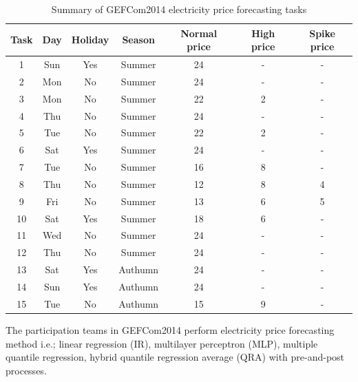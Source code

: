 \documentclass[review]{elsarticle}
\begin{document}
      \begin{table}[H]
        \begin{center}
        \caption{Summary of GEFCom2014 electricity price forecasting tasks}
        \begin{adjustbox}{width=\textwidth}
          \begin{tabular}{|c|c|c|c|c|c|c|}
            \hline
            Task & Day & Holiday & Season & Normal price & High price & Spike price\\
            \hline
            1 & Sun & Yes & Summer & 24 & - & -\\
            2 & Mon & No & Summer & 24 & - & -\\
            3 & Mon & No & Summer & 22 & 2 & -\\
            4 & Thu & No & Summer & 24 & - & -\\
            5 & Tue & No & Summer & 22 & 2 & -\\
            6 & Sat & Yes & Summer & 24 & - & -\\
            7 & Tue & No & Summer & 16 & 8 & -\\
            8 & Thu & No & Summer & 12 & 8 & 4\\
            9 & Fri & No & Summer & 13 & 6 & 5\\
            10 & Sat & Yes & Summer & 18 & 6 & -\\
            11 & Wed & No & Summer & 24 & - & -\\
            12 & Thu & No & Summer & 24 & - & -\\
            13 & Sat & Yes & Authumn & 24 & - & -\\
            14 & Sun & Yes & Authumn & 24 & - & -\\
            15 & Tue & No & Authumn & 15 & 9 & -\\
            \hline
          \end{tabular}
        \end{adjustbox}
        \label{table:price_data_set}
        \end{center}
      \end{table}

      The participation teams in GEFCom2014 perform electricity price forecasting method i.e.; linear regression (IR)\cite{Dudek2016}, multilayer perceptron (MLP)\cite{Dudek2016},  multiple quantile regression\cite{Juban2016}, hybrid quantile regression average (QRA) with pre-and-post processes\cite{Maciejowska2016}.
\end{document}

